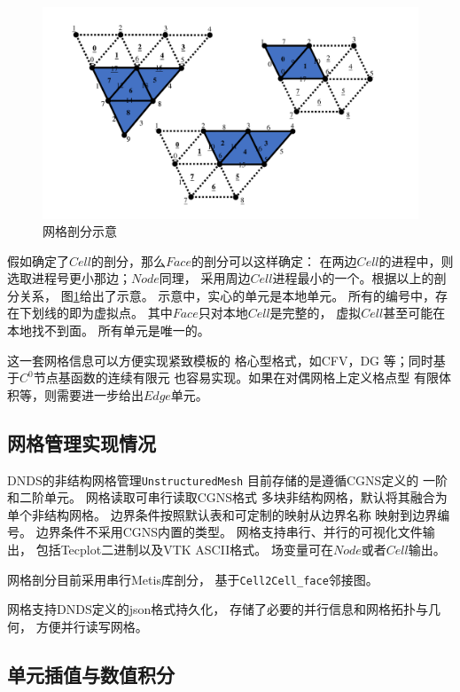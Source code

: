 \documentclass[UTF8,zihao=5]{ctexart} %
\begin{document}
\begin{figure}[htbp]
    \centering
    \includegraphics[width=12cm]{mesh_A_Part.pdf}
    \caption{网格剖分示意}
    \label{fig:mesh_A_Part}
\end{figure}

假如确定了$Cell$的剖分，那么$Face$的剖分可以这样确定：
在两边$Cell$的进程中，则选取进程号更小那边；$Node$同理，
采用周边$Cell$进程最小的一个。根据以上的剖分关系，
图\ref{fig:mesh_A_Part}给出了示意。
示意中，实心的单元是本地单元。
所有的编号中，存在下划线的即为虚拟点。
其中$Face$只对本地$Cell$是完整的，
虚拟$Cell$甚至可能在本地找不到面。
所有单元是唯一的。

这一套网格信息可以方便实现紧致模板的
格心型格式，如CFV，DG
等；同时基于$C^0$节点基函数的连续有限元
也容易实现。如果在对偶网格上定义格点型
有限体积等，则需要进一步给出$Edge$单元。

\subsection{网格管理实现情况}

DNDS的非结构网格管理\verb|UnstructuredMesh|
目前存储的是遵循CGNS定义的
一阶和二阶单元。
网格读取可串行读取CGNS格式
多块非结构网格，默认将其融合为单个非结构网格。
边界条件按照默认表和可定制的映射从边界名称
映射到边界编号。
边界条件不采用CGNS内置的类型。
网格支持串行、并行的可视化文件输出，
包括Tecplot二进制以及VTK ASCII格式。
场变量可在$Node$或者$Cell$输出。

网格剖分目前采用串行Metis库剖分，
基于\verb|Cell2Cell_face|邻接图。

网格支持DNDS定义的json格式持久化，
存储了必要的并行信息和网格拓扑与几何，
方便并行读写网格。

\subsection{单元插值与数值积分}
\end{document}
